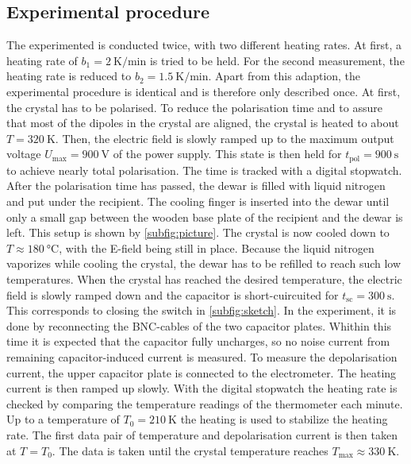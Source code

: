 \subsection{Experimental procedure}
%
The experimented is conducted twice, with two different heating rates.
At first, a heating rate of $b_1 = \qty{2}{\kelvin\per\minute}$ is tried to be held.
For the second measurement, the heating rate is reduced to $b_2 = \qty{1.5}{\kelvin\per\minute}$.
Apart from this adaption, the experimental procedure is identical and is therefore only described once.
\newline\noindent
At first, the crystal has to be polarised. 
To reduce the polarisation time and to assure that most of the dipoles in the crystal are aligned, the crystal is heated to about $T = \qty{320}{\kelvin}$.
Then, the electric field is slowly ramped up to the maximum output voltage $U_{\max} = \qty{900}{\volt}$ of the power supply.
This state is then held for $t_{\mathrm{pol}} = \qty{900}{\second}$ to achieve nearly total polarisation.
The time is tracked with a digital stopwatch.
\newline\noindent
After the polarisation time has passed, the dewar is filled with liquid nitrogen and put under the recipient.
The cooling finger is inserted into the dewar until only a small gap between the wooden base plate of the recipient and the dewar is left. 
This setup is shown by \autoref{subfig:picture}.
The crystal is now cooled down to $T \approx \qty{180}{\degreeCelsius}$, with the E-field being still in place.
Because the liquid nitrogen vaporizes while cooling the crystal, the dewar has to be refilled to reach such low temperatures.
\newline\noindent
When the crystal has reached the desired temperature, the electric field is slowly ramped down and the capacitor is short-cuircuited for $t_{\mathrm{sc}} = \qty{300}{\second}$.
This corresponds to closing the switch in \autoref{subfig:sketch}.
In the experiment, it is done by reconnecting the BNC-cables of the two capacitor plates.
Whithin this time it is expected that the capacitor fully uncharges, so no noise current from remaining capacitor-induced current is measured.
\newline\noindent
To measure the depolarisation current, the upper capacitor plate is connected to the electrometer.
The heating current is then ramped up slowly.
With the digital stopwatch the heating rate is checked by comparing the temperature readings of the thermometer each minute.
Up to a temperature of $T_0 = \qty{210}{\kelvin}$ the heating is used to stabilize the heating rate.
The first data pair of temperature and depolarisation current is then taken at $T = T_0$.
The data is taken until the crystal temperature reaches $T_{\max} \approx \qty{330}{\kelvin}$.